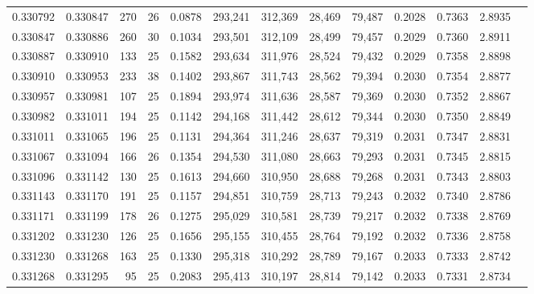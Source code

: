 \begin{tabular}{rrrrrrrrrrrrr}
0.330792 & 0.330847 &   270 &  26 &                                     0.0878 & 293,241 & 312,369 &  28,469 &  79,487 & 0.2028 & 0.7363 & 2.8935 \\
0.330847 & 0.330886 &   260 &  30 &                                     0.1034 & 293,501 & 312,109 &  28,499 &  79,457 & 0.2029 & 0.7360 & 2.8911 \\
0.330887 & 0.330910 &   133 &  25 &                                     0.1582 & 293,634 & 311,976 &  28,524 &  79,432 & 0.2029 & 0.7358 & 2.8898 \\
0.330910 & 0.330953 &   233 &  38 &                                     0.1402 & 293,867 & 311,743 &  28,562 &  79,394 & 0.2030 & 0.7354 & 2.8877 \\
0.330957 & 0.330981 &   107 &  25 &                                     0.1894 & 293,974 & 311,636 &  28,587 &  79,369 & 0.2030 & 0.7352 & 2.8867 \\
0.330982 & 0.331011 &   194 &  25 &                                     0.1142 & 294,168 & 311,442 &  28,612 &  79,344 & 0.2030 & 0.7350 & 2.8849 \\
0.331011 & 0.331065 &   196 &  25 &                                     0.1131 & 294,364 & 311,246 &  28,637 &  79,319 & 0.2031 & 0.7347 & 2.8831 \\
0.331067 & 0.331094 &   166 &  26 &                                     0.1354 & 294,530 & 311,080 &  28,663 &  79,293 & 0.2031 & 0.7345 & 2.8815 \\
0.331096 & 0.331142 &   130 &  25 &                                     0.1613 & 294,660 & 310,950 &  28,688 &  79,268 & 0.2031 & 0.7343 & 2.8803 \\
0.331143 & 0.331170 &   191 &  25 &                                     0.1157 & 294,851 & 310,759 &  28,713 &  79,243 & 0.2032 & 0.7340 & 2.8786 \\
0.331171 & 0.331199 &   178 &  26 &                                     0.1275 & 295,029 & 310,581 &  28,739 &  79,217 & 0.2032 & 0.7338 & 2.8769 \\
0.331202 & 0.331230 &   126 &  25 &                                     0.1656 & 295,155 & 310,455 &  28,764 &  79,192 & 0.2032 & 0.7336 & 2.8758 \\
0.331230 & 0.331268 &   163 &  25 &                                     0.1330 & 295,318 & 310,292 &  28,789 &  79,167 & 0.2033 & 0.7333 & 2.8742 \\
0.331268 & 0.331295 &    95 &  25 &                                     0.2083 & 295,413 & 310,197 &  28,814 &  79,142 & 0.2033 & 0.7331 & 2.8734 \\

\end{tabular}
